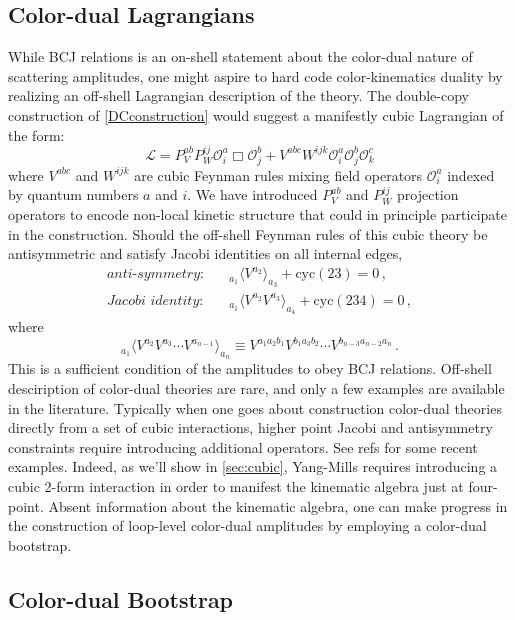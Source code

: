 \documentclass[11pt,letter]{article}
\def\be{\begin{equation}}
\def\ee{\end{equation}}
\begin{document}
\subsection{Color-dual Lagrangians}
While BCJ relations is an on-shell statement about the color-dual nature of scattering amplitudes, one might aspire to hard code color-kinematics duality by realizing an off-shell Lagrangian description of the theory. The double-copy construction of \ref{DCconstruction} would suggest a manifestly cubic Lagrangian of the form:
\be
\mathcal{L} = P_V^{ab}P_W^{ij}\mathcal{O}^a_i \Box \mathcal{O}^b_j +  V^{abc} W^{ijk}\mathcal{O}^a_i \mathcal{O}^b_j \mathcal{O}^c_k
\ee
where $V^{abc}$ and $W^{ijk}$ are cubic Feynman rules mixing field operators $\mathcal{O}^{a}_i$ indexed by quantum numbers $a$ and $i$. We have introduced $P_V^{ab}$ and $P_W^{ij}$ projection operators to encode non-local kinetic structure that could in principle participate in the construction. Should the off-shell Feynman rules of this cubic theory be antisymmetric and satisfy Jacobi identities on all internal edges,
\begin{align}
\textit{anti-symmetry}:& \quad{}_{a_1}\langle V^{a_2} \rangle_{a_3}+\text{cyc}(23)=0\,,
\\
\textit{Jacobi identity}:& \quad {}_{a_1}\langle V^{a_2} V^{a_3}\rangle_{a_4}+\text{cyc}(234)=0\,,
\end{align}
where 
\be
{}_{a_1}\langle V^{a_2}V^{a_3}\cdots V^{a_{n-1}} \rangle_{a_n} \equiv V^{a_1a_2b_1}V^{b_1a_3b_2}\cdots V^{b_{n-3} a_{n-2}a_n}\,.
\ee
This is a sufficient condition of the amplitudes to obey BCJ relations. Off-shell desciription of color-dual theories are rare, and only a few examples are available in the literature. Typically when one goes about construction color-dual theories directly from a set of cubic interactions, higher point Jacobi and antisymmetry constraints require introducing additional operators. See refs \cite{} for some recent examples. Indeed, as we'll show in \cref{sec:cubic}, Yang-Mills requires introducing a cubic 2-form interaction in order to manifest the kinematic algebra just at four-point. Absent information about the kinematic algebra, one can make progress in the construction of loop-level color-dual amplitudes by employing a color-dual bootstrap. 
\subsection{Color-dual Bootstrap}
\label{sec:bootstrap}
\end{document}
